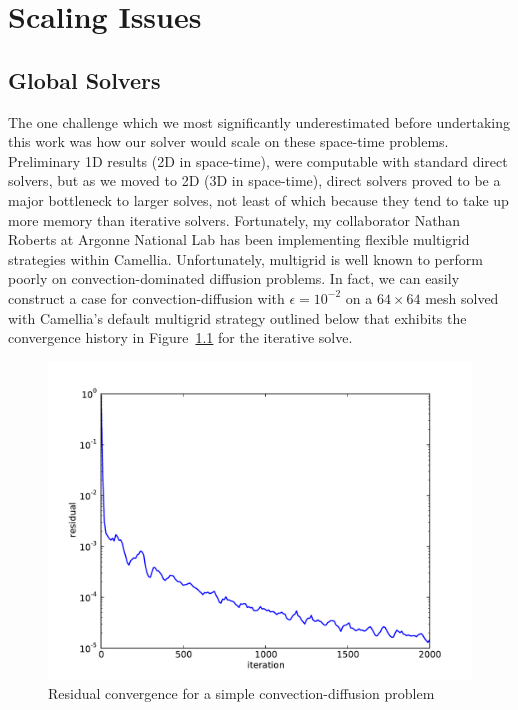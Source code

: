 \documentclass[Dissertation.tex]{subfiles}
\begin{document}
\graphicspath{{../Figures/}}
\chapter{Scaling Issues}
\label{sec:Scaling}

\section{Global Solvers}
The one challenge which we most significantly underestimated before undertaking this work 
was how our solver would scale on these space-time problems.
Preliminary 1D results (2D in space-time), were computable with standard direct solvers,
but as we moved to 2D (3D in space-time), direct solvers proved to be a major bottleneck
to larger solves, not least of which because they tend to take up more memory than iterative solvers.
Fortunately, my collaborator Nathan Roberts at Argonne National Lab has been implementing 
flexible multigrid strategies within Camellia.
Unfortunately, multigrid is well known to perform poorly on convection-dominated diffusion problems.
In fact, we can easily construct a case for convection-diffusion with $\epsilon=10^{-2}$ on a $64\times64$
mesh solved with Camellia's default multigrid strategy outlined below that
exhibits the convergence history in Figure~\ref{fig:ConfusionResidual} for the iterative solve.
\begin{figure}[!ht]
\centering
\includegraphics[width=\textwidth]{Dissertation/Scaling/ConfusionResidual.pdf}
\caption{Residual convergence for a simple convection-diffusion problem}
\label{fig:ConfusionResidual}
\end{figure}
\end{document}
